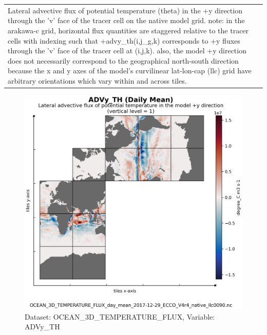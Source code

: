 \begin{longtable}{|m{}|m{}|m{}|m{}|}
\rowcolor{lightgray} \multicolumn{4}{|c|}{\textbf{Comments}} \\ \hline
\multicolumn{4}{|p{1\textwidth}|}{\footnotesize{{Lateral advective flux of potential temperature (theta) in the +y direction through the 'v' face of the tracer cell on the native model grid. note: in the arakawa-c grid, horizontal flux quantities are staggered relative to the tracer cells with indexing such that +advy\_th(i,j\_g,k) corresponds to +y fluxes through the 'v' face of the tracer cell at (i,j,k). also, the model +y direction does not necessarily correspond to the geographical north-south direction because the x and y axes of the model's curvilinear lat-lon-cap (llc) grid have arbitrary orientations which vary within and across tiles.}}} \\ \hline
\end{longtable}

\begin{figure}[H]
\centering
\includegraphics[scale=0.55]{../images/plots/v4r4/native_plots/Ocean_Three-Dimensional_Potential_Temperature_Fluxes/ADVy_TH.png}
\caption{Dataset: OCEAN\_3D\_TEMPERATURE\_FLUX, Variable: ADVy\_TH}
\label{tab:table-OCEAN_3D_TEMPERATURE_FLUX_ADVy_TH-Plot}
\end{figure}
\newpage
\pagebreak

